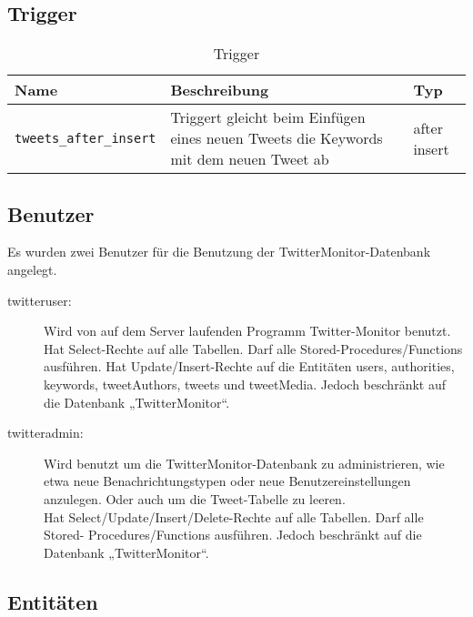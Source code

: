 \subsection{Trigger}

\begin{table}[!ht]
\caption{Trigger}
  \begin{tabular}{p{3.6cm}p{7.6cm}p{2.6cm}}
    \toprule 
    \textbf{Name}  & \textbf{Beschreibung} & \textbf{Typ} \\
    \hline 
    \texttt{tweets\_after\_insert} & Triggert gleicht beim Einfügen eines neuen Tweets die Keywords mit dem neuen Tweet ab & after insert  \\
	\bottomrule
  \end{tabular}
\end{table}

\subsection{Benutzer}

Es wurden zwei Benutzer für die Benutzung der TwitterMonitor-Datenbank angelegt.  
\begin{description}
	\item [twitteruser: ] Wird von auf dem Server laufenden Programm Twitter-Monitor benutzt. Hat Select-Rechte auf alle Tabellen. Darf alle Stored-Procedures/Functions ausführen. Hat Update/Insert-Rechte auf die Entitäten users, authorities, keywords, tweetAuthors, tweets und tweetMedia. Jedoch beschränkt auf die Datenbank „TwitterMonitor“. 
	\item [twitteradmin: ] Wird benutzt um die TwitterMonitor-Datenbank zu administrieren, wie etwa neue Benachrichtungstypen oder neue Benutzereinstellungen anzulegen. Oder auch um die 
		Tweet-Tabelle zu leeren. \\
		Hat Select/Update/Insert/Delete-Rechte auf alle Tabellen. Darf alle Stored-
		Procedures/Functions ausführen. Jedoch beschränkt auf die Datenbank
		„TwitterMonitor“. 
\end{description}
 
\subsection{Entitäten}
 
